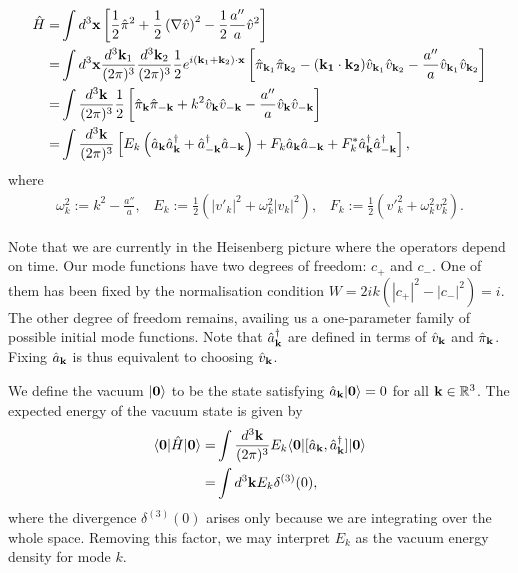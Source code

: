 \begin{align}
	\hat{H} =& \int d^3 \mathbf{x} \left[ \frac{1}{2} \hat{\pi}^2 + \frac{1}{2} \left( \nabla \hat{v} \right)^2 - \frac{1}{2}\frac{a''}{a} \hat{v}^2 \right] \label{eqn:single_field_inflation_simple_hammiltonian}\\
	=& \int d^3 \mathbf{x} \frac{d^3 \mathbf{k}_1}{(2\pi)^3} \frac{d^3 \mathbf{k}_2}{(2\pi)^3} \frac{1}{2} e^{i(\mathbf{k}_1 + \mathbf{k}_2) \cdot \mathbf{x}}  \left[ \hat{\pi}_{\mathbf{k}_1} \hat{\pi}_{\mathbf{k}_2} - (\mathbf{k_1} \cdot \mathbf{k_2}) \hat{v}_{\mathbf{k}_1} \hat{v}_{\mathbf{k}_2} - \frac{a''}{a} \hat{v}_{\mathbf{k}_1} \hat{v}_{\mathbf{k}_2} \right] \\
	=& \int \frac{d^3 \mathbf{k}}{(2\pi)^3}  \frac{1}{2} \left[ \hat{\pi}_{\mathbf{k}} \hat{\pi}_{-\mathbf{k}} + k^2 \hat{v}_{\mathbf{k}} \hat{v}_{-\mathbf{k}} - \frac{a''}{a} \hat{v}_{\mathbf{k}} \hat{v}_{-\mathbf{k}} \right] \\
	=&  \int \frac{d^3 \mathbf{k}}{(2\pi)^3} \left[ E_k \left( \hat{a}_\mathbf{k} \hat{a}^\dagger_\mathbf{k} + \hat{a}^\dagger_{-\mathbf{k}} \hat{a}_{-\mathbf{k}} \right) + F_k \hat{a}_{\mathbf{k}} \hat{a}_{-\mathbf{k}} + F_k^* \hat{a}^\dagger_{\mathbf{k}} \hat{a}^\dagger_{-\mathbf{k}}  \right],
\end{align}
where
\begin{align}
	\omega_k^2 := k^2 - \frac{a''}{a}, \;\;\; E_k := \frac{1}{2}(|v'_k|^2 + \omega_k^2 |v_k|^2), \;\;\; F_k := \frac{1}{2}(v'^2_k + \omega_k^2 v^2_k).
\end{align}

Note that we are currently in the Heisenberg picture where the operators depend on time. Our mode functions have two degrees of freedom: $c_+$ and $c_-$. One of them has been fixed by the normalisation condition $W=2ik(|c_+|^2-|c_-|^2)=i$. The other degree of freedom remains, availing us a one-parameter family of possible initial mode functions. Note that $\hat{a}^\dagger_\mathbf{k}$ are defined in terms of $\hat{v}_\mathbf{k}$ and $\hat{\pi}_\mathbf{k}$. Fixing $\hat{a}_\mathbf{k}$ is thus equivalent to choosing $\hat{v}_\mathbf{k}$.

We define the vacuum $|\mathbf{0}\rangle$ to be the state satisfying $\hat{a}_\mathbf{k} |\mathbf{0}\rangle = 0$ for all $\mathbf{k} \in \mathbb{R}^3$. The expected energy of the vacuum state is given by
\begin{align}
	\langle \mathbf{0} | \hat{H} | \mathbf{0} \rangle =& \int \frac{d^3\mathbf{k}}{(2\pi)^3} E_k \langle \mathbf{0} | [ \hat{a}_\mathbf{k}, \hat{a}^\dagger_\mathbf{k} ] | \mathbf{0} \rangle	\\
	=& \int d^3\mathbf{k} E_k \delta^{(3)}(0),
\end{align}
where the divergence $\delta^{(3)}(0)$ arises only because we are integrating over the whole space. Removing this factor, we may interpret $E_k$ as the vacuum energy density for mode $k$.

